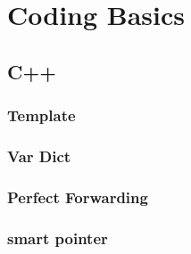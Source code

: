 \section{Coding Basics}
\subsection{C++}
\subsubsection{Template}
\subsubsection{Var Dict}
\subsubsection{Perfect Forwarding}
\subsubsection{smart pointer}